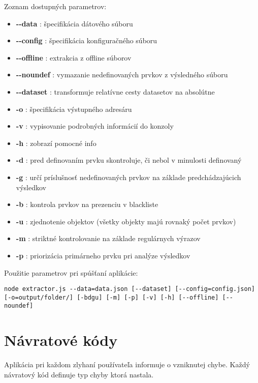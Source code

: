 Zoznam dostupných parametrov:

\begin{itemize}
    \item \textbf{-{}-data} : špecifikácia dátového súboru
    \item \textbf{-{}-config} : špecifikácia konfiguračného súboru
    \item \textbf{-{}-offline} : extrakcia z offline súborov
    \item \textbf{-{}-noundef} : vymazanie nedefinovaných prvkov z výsledného súboru
    \item \textbf{-{}-dataset} : transformuje relatívne cesty datasetov na absolútne
    \item \textbf{-o} : špecifikácia výstupného adresáru
    \item \textbf{-v} : vypisovanie podrobných informácií do konzoly
    \item \textbf{-h} : zobrazí pomocné info
    \item \textbf{-d} : pred definovaním prvku skontroluje, či nebol v minulosti definovaný
    \item \textbf{-g} : určí príslušnosť nedefinovaných prvkov na základe predchádzajúcich výsledkov
    \item \textbf{-b} : kontrola prvkov na prezenciu v blackliste
    \item \textbf{-u} : zjednotenie objektov (všetky objekty majú rovnaký počet prvkov)
    \item \textbf{-m} : striktné kontrolovanie na základe regulárnych výrazov
    \item \textbf{-p} : priorizácia primárneho prvku pri analýze výsledkov
\end{itemize}

Použitie parametrov pri spúšťaní aplikácie:

\bigskip
\texttt{node extractor.js -{}-data=data.json  [-{}-dataset] [-{}-config=config.json]}\\
\texttt{[-o=output/folder/] [-bdgu] [-m] [-p] [-v] [-h] [-{}-offline] [-{}-noundef] }

\newpage

\section{Návratové kódy}

Aplikácia pri každom zlyhaní používateľa informuje o vzniknutej chybe. Každý návratový kód definuje typ chyby ktorá nastala.


